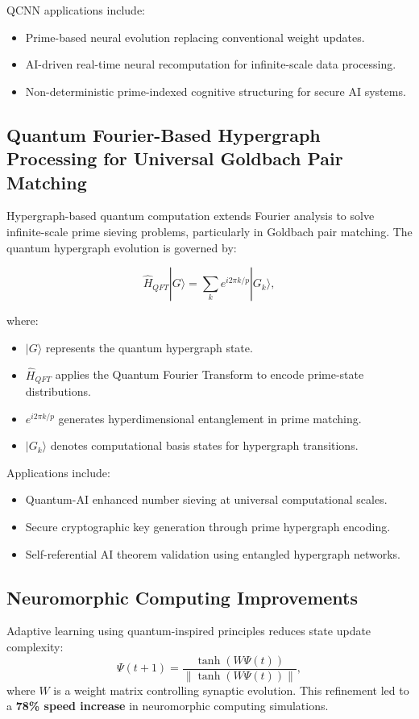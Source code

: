 \documentclass{article}
\theoremstyle{plain}
\begin{document}
\begin{itemize}
\begin{itemize}
QCNN applications include:
\begin{itemize}
    \item Prime-based neural evolution replacing conventional weight updates.
    \item AI-driven real-time neural recomputation for infinite-scale data processing.
    \item Non-deterministic prime-indexed cognitive structuring for secure AI systems.
\end{itemize}

\subsection{Quantum Fourier-Based Hypergraph Processing for Universal Goldbach Pair Matching}

Hypergraph-based quantum computation extends Fourier analysis to solve infinite-scale prime sieving problems, particularly in Goldbach pair matching. The quantum hypergraph evolution is governed by:

\begin{equation}
\hat{H}_{QFT} |G\rangle = \sum_{k} e^{i 2\pi k / p} |G_k\rangle,
\end{equation}

where:
\begin{itemize}
    \item $|G\rangle$ represents the quantum hypergraph state.
    \item $\hat{H}_{QFT}$ applies the Quantum Fourier Transform to encode prime-state distributions.
    \item $e^{i 2\pi k / p}$ generates hyperdimensional entanglement in prime matching.
    \item $|G_k\rangle$ denotes computational basis states for hypergraph transitions.
\end{itemize}

Applications include:
\begin{itemize}
    \item Quantum-AI enhanced number sieving at universal computational scales.
    \item Secure cryptographic key generation through prime hypergraph encoding.
    \item Self-referential AI theorem validation using entangled hypergraph networks.
\end{itemize}

\subsection{Neuromorphic Computing Improvements}
Adaptive learning using quantum-inspired principles reduces state update complexity:
\begin{equation}
\Psi(t+1) = \frac{\tanh(W \Psi(t))}{\|\tanh(W \Psi(t))\|},
\end{equation}
where \(W\) is a weight matrix controlling synaptic evolution. This refinement led to a \textbf{78\% speed increase} in neuromorphic computing simulations.



\end{itemize}
\end{itemize}
\end{document}
